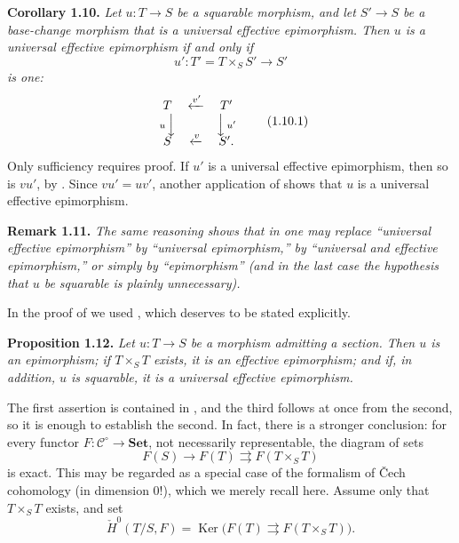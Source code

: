 \medskip
\noindent{}\textbf{Corollary 1.10.}
\textit{Let \(u:T\to S\) be a squarable morphism, and let \(S'\to S\) be a
base-change morphism that is a universal effective epimorphism. Then \(u\)
is a universal effective epimorphism if and only if}
\[
  u':T'=T\times_SS'\longrightarrow S'
\]
\textit{is one:}
\[
\begin{array}{ccc}
  T & \xleftarrow{v'} & T' \\
  \scriptstyle u\,\Big\downarrow & & \Big\downarrow\,\scriptstyle u' \\[-0.25em]
  S & \xleftarrow{v} & S'.
\end{array}
\tag{1.10.1}\label{sga3:iv:corollary:1:10:eq:1:10:1:01}
\]
Only sufficiency requires proof. If \(u'\) is a universal effective
epimorphism, then so is \(vu'\), by . Since \(vu'=uv'\), another
application of  shows that \(u\) is a universal effective epimorphism.

\medskip
\noindent{}\textbf{Remark 1.11.}
\textit{The same reasoning shows that in  one may replace ``universal
effective epimorphism'' by ``universal epimorphism,'' by ``universal and
effective epimorphism,'' or simply by ``epimorphism'' (and in the last case
the hypothesis that \(u\) be squarable is plainly unnecessary).}

In the proof of  we used , which deserves to be stated
explicitly.

\medskip
\noindent{}\textbf{Proposition 1.12.}
\textit{Let \(u:T\to S\) be a morphism admitting a section. Then \(u\) is an
epimorphism; if \(T\times_ST\) exists, it is an effective epimorphism; and if,
in addition, \(u\) is squarable, it is a universal effective epimorphism.}

The first assertion is contained in , and the third follows at once
from the second, so it is enough to establish the second. In fact, there is a
stronger conclusion: for every functor
\(F:\mathscr C^{\circ}\to\mathbf{Set}\), not necessarily representable, the
diagram of sets
\[
  F(S)\longrightarrow F(T)\rightrightarrows F(T\times_ST)
\]
is exact. This may be regarded as a special case of the formalism of
\v{C}ech cohomology (in dimension \(0\)!), which we merely recall here.
Assume only that \(T\times_ST\) exists, and set
\[
  \check H^{0}(T/S,F)
  =\operatorname{Ker}\bigl(F(T)\rightrightarrows F(T\times_ST)\bigr).
\]

